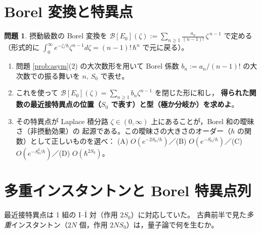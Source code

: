 \documentclass[dvipdfmx, uplatex]{jsarticle}
\newcommand{\hb}{\hbar}
\newcommand{\Bor}{\mathcal{B}}
\theoremstyle{definition}
\newtheorem{prob}{問題}
\begin{document}
\section{Borel 変換と特異点}

\begin{prob}\label{prob:borel}
摂動級数の Borel 変換を
$\displaystyle\Bor[E_0](\zeta):=\sum_{n\ge1}\frac{a_n}{(n-1)!}\,\zeta^{\,n-1}$
で定める（形式的に $\int_0^\infty e^{-\zeta/\hb}\zeta^{n-1}d\zeta=(n-1)!\,\hb^n$ で元に戻る）。
\begin{enumerate}
\item 問題 \ref{prob:asym}(2) の大次数形を用いて Borel 係数 $b_n:=a_n/(n-1)!$ の大次数での振る舞いを
$n,\,S_0$ で表せ。
\item これを使って $\Bor[E_0](\zeta)=\sum_{n\ge1}b_n\zeta^{n-1}$ を閉じた形に和し，
\textbf{得られた関数の最近接特異点の位置（$S_0$ で表す）と型（極か分岐か）を求めよ}。
\item その特異点が Laplace 積分路 $\zeta\in(0,\infty)$ 上にあることが，Borel 和の曖昧さ（非摂動効果）の
起源である。この曖昧さの大きさのオーダー（$\hb$ の関数）として正しいものを選べ：
(A) $O(e^{-2S_0/\hb})$／(B) $O(e^{-S_0/\hb})$／(C) $O(e^{-S_0^2/\hb})$／(D) $O(\hb^{2S_0})$。
\end{enumerate}
\end{prob}

\section{多重インスタントンと Borel 特異点列}
最近接特異点は 1 組の I--$\bar{\mathrm I}$ 対（作用 $2S_0$）に対応していた。
古典前半で見た\emph{多重}インスタントン（$2N$ 個，作用 $2NS_0$）は，量子論で何を生むか。
\end{document}
